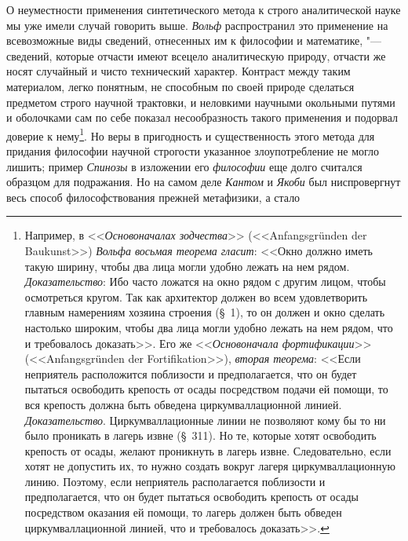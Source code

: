 О неуместности применения синтетического метода к строго
аналитической науке мы уже имели случай говорить выше.
{\em Вольф} распространил
это применение на всевозможные виды сведений, отнесенных им к философии и
математике, "--- сведений, которые отчасти имеют всецело
аналитическую природу, отчасти же носят случайный и чисто технический
характер. Контраст между таким материалом, легко понятным, не способным по
своей природе сделаться предметом строго научной трактовки, и неловкими
научными окольными путями и оболочками сам по себе показал
несообразность такого применения и подорвал доверие к
нему\footnote{Например, в <<{\em Основоначалах зодчества}>>
(<<Anfangs\-gründen der Bau\-kunst>>) {\em Вольфа восьмая теорема гласит}:
<<Окно должно иметь такую ширину, чтобы два лица
могли удобно лежать на нем рядом. {\em Доказательство}:
Ибо часто ложатся на окно рядом с другим лицом, чтобы
осмотреться кругом. Так как архитектор должен во всем удовлетворить главным
намерениям хозяина строения (\S~1), то он должен и окно сделать настолько
широким, чтобы два лица могли удобно лежать на нем рядом, что и требовалось
доказать>>. Его же <<{\em Основоначала фортификации}>>
(<<Anfangs\-grün\-den der For\-tifika\-tion>>), {\em вторая теорема}:
<<Если неприятель расположится поблизости и предполагается,
что он будет пытаться освободить крепость от осады посредством подачи ей
помощи, то вся крепость должна быть обведена циркумваллационной
линией. {\em Доказательство}.
Циркумваллационные линии не позволяют кому бы то ни было
проникать в лагерь извне (\S~311). Но те, которые хотят освободить крепость
от осады, желают проникнуть в лагерь извне. Следовательно, если хотят не
допустить их, то нужно создать вокруг лагеря циркумваллационную линию.
Поэтому, если неприятель располагается поблизости и предполагается, что он
будет пытаться освободить крепость от осады посредством оказания ей помощи,
то лагерь должен быть обведен циркумваллационной линией, что и требовалось
доказать>>.}. Но веры в пригодность и существенность этого
метода для придания философии научной строгости указанное злоупотребление
не могло лишить; пример {\em Спинозы}
в изложении его
{\em философии} еще долго
считался образцом для подражания. Но на самом деле
{\em Кантом} и
{\em Якоби} был
ниспровергнут весь способ философствования прежней метафизики, а стало
